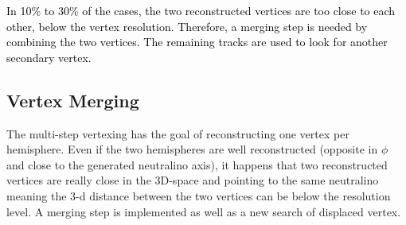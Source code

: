 \documentclass{cernatlasnote}
\begin{document}
    \textcolor{black}{In 10\% to 30\% of the cases, the two reconstructed vertices are too close to each other, below the vertex resolution. Therefore, a merging step is needed by combining the two vertices. The remaining tracks are used to look for another secondary vertex.}\\
    \subsection{Vertex Merging}
        
        The multi-step vertexing has the goal of reconstructing one vertex per hemisphere. Even if the two hemispheres are well reconstructed (opposite in $\phi$ and close to the generated neutralino axis), it happens that two reconstructed vertices are really close in the 3D-space and pointing to the same neutralino meaning the 3-d distance between the two vertices can be below the resolution level. A merging step is implemented as well as a new search of displaced vertex.
\end{document}
